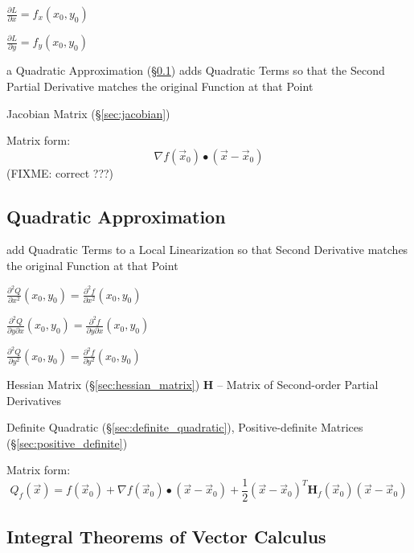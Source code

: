 $\frac{\partial{L}}{\partial{x}} = f_x(x_0,y_0)$

$\frac{\partial{L}}{\partial{y}} = f_y(x_0,y_0)$

a Quadratic Approximation (\S\ref{sec:quadratic_approximation}) adds Quadratic
Terms so that the Second Partial Derivative matches the original Function at
that Point

\fist Jacobian Matrix (\S\ref{sec:jacobian})

Matrix form:
\[
  \nabla f(\vec{x}_0) \bullet (\vec{x}-\vec{x}_0)
\]
(FIXME: correct ???)



\subsection{Quadratic Approximation}\label{sec:quadratic_approximation}

add Quadratic Terms to a Local Linearization so that Second Derivative matches
the original Function at that Point

$\frac{\partial^2{Q}}{\partial{x^2}}(x_0,y_0) =
  \frac{\partial^2{f}}{\partial{x^2}}(x_0,y_0)$

$\frac{\partial^2{Q}}{\partial{y}\partial{x}}(x_0,y_0) =
  \frac{\partial^2{f}}{\partial{y}\partial{x}}(x_0,y_0)$

$\frac{\partial^2{Q}}{\partial{y^2}}(x_0,y_0) =
  \frac{\partial^2{f}}{\partial{y^2}}(x_0,y_0)$

\fist Hessian Matrix (\S\ref{sec:hessian_matrix}) $\mathbf{H}$ -- Matrix of
Second-order Partial Derivatives

\fist Definite Quadratic (\S\ref{sec:definite_quadratic}), Positive-definite
Matrices (\S\ref{sec:positive_definite})

Matrix form:
\[
  Q_f(\vec{x}) = f(\vec{x}_0) + \nabla{f(\vec{x}_0)}\bullet (\vec{x}-\vec{x}_0)
  + \frac{1}{2}(\vec{x}-\vec{x}_0)^T\mathbf{H}_f(\vec{x}_0)(\vec{x}-\vec{x}_0)
\]



\subsection{Integral Theorems of Vector Calculus}
\label{sec:integral_theorems}

